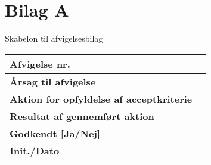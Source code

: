 \newpage
\appendix

\section{\\Bilag A} \label{App:BilagA}

Skabelon til afvigelsesbilag 

\begin{tabularx}{1\textwidth}{|l|X|}
\hline
\textbf{Afvigelse nr.}              &   \\ \hline
\textbf{Årsag til afvigelse}        &   \\ \hline
\textbf{Aktion for opfyldelse af acceptkriterie}            & \\ \hline
\textbf{Resultat af gennemført aktion}           &  \\ \hline
\textbf{Godkendt {[}Ja/Nej{]}} &  \\ \hline
\textbf{Init./Dato}            &  \\ \hline
\end{tabularx}